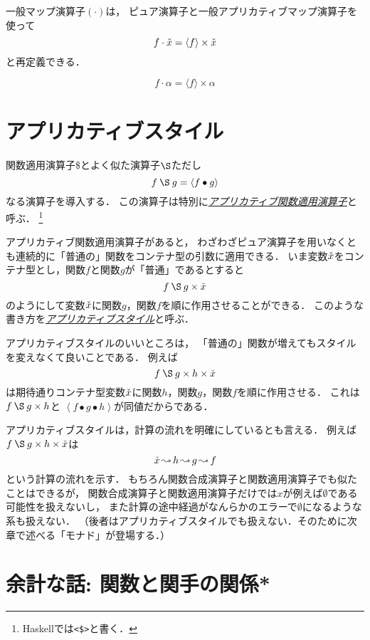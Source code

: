 \documentclass[a4paper,draft]{jsbook}
\newcommand{\programminglanguage}[1]{\textsf{#1}}
\newcommand{\haskell}{\programminglanguage{Haskell}}
\newcommand{\keyword}[1]{{\underline{\emph{#1}}}}
\newcommand{\code}[1]{\texttt{#1}}
\newcommand{\mPureOf}[1]{\langle#1\rangle}
\DeclareMathOperator{\mFlow}{\leadsto}
\DeclareMathOperator{\mMap}{\cdot}
\DeclareMathOperator{\mApplicativeMap}{\times}
\newcommand{\mathContainerVar}[1]{\Check{#1}}
\newcommand{\mathPureWith}[1]{\left\langle#1\right\rangle}
\newcommand{\mathNothing}{\emptyset}
\newcommand{\mathApplicativeApply}{\mathbin{\S}}
\newcommand{\mathApplicativeGeneralMap}{\mathbin{\times}}
\newcommand{\mathApply}{\mathbin{\$}}
\newcommand{\mathCompose}{\mathbin{\bullet}}
\newcommand{\mathGeneralMap}{\mathbin{\cdot}}
\begin{document}
一般マップ演算子$(\mathGeneralMap)$は，
ピュア演算子と一般アプリカティブマップ演算子を使って
$$
f\mathGeneralMap\mathContainerVar{x}=\mathPureWith{f}\mathApplicativeGeneralMap\mathContainerVar{x}
$$
と再定義できる．

$$f\mMap\alpha=\mPureOf{f}\mApplicativeMap\alpha$$

\section{アプリカティブスタイル}

関数適用演算子$\mathApply$とよく似た演算子$\mathApplicativeApply$ただし
$$
f\mathApplicativeApply g=\mathPureWith{f\mathCompose g}
$$
なる演算子を導入する．
この演算子は特別に\keyword{アプリカティブ関数適用演算子}と呼ぶ．%
\footnote{\haskell では\code{<\$>}と書く．}

アプリカティブ関数適用演算子があると，
わざわざピュア演算子を用いなくとも連続的に「普通の」関数をコンテナ型の引数に適用できる．
いま変数$\mathContainerVar{x}$をコンテナ型とし，関数$f$と関数$g$が「普通」であるとすると
$$
f\mathApplicativeApply g\mathApplicativeGeneralMap\mathContainerVar{x}
$$
のようにして変数$\mathContainerVar{x}$に関数$g$，関数$f$を順に作用させることができる．
このような書き方を\keyword{アプリカティブスタイル}と呼ぶ．

アプリカティブスタイルのいいところは，
「普通の」関数が増えてもスタイルを変えなくて良いことである．
例えば
$$
f\mathApplicativeApply g\mathApplicativeGeneralMap h\mathApplicativeGeneralMap\mathContainerVar{x}
$$
は期待通りコンテナ型変数$\mathContainerVar{x}$に関数$h$，関数$g$，関数$f$を順に作用させる．
これは$f\mathApplicativeApply g\mathApplicativeGeneralMap h$と%
$\mathPureWith{f\mathCompose g\mathCompose h}$が同値だからである．

アプリカティブスタイルは，計算の流れを明確にしているとも言える．
例えば$f\mathApplicativeApply g\mathApplicativeGeneralMap h\mathApplicativeGeneralMap\mathContainerVar{x}$は
$$
\mathContainerVar{x}\mFlow h\mFlow g\mFlow f
$$
という計算の流れを示す．
もちろん関数合成演算子と関数適用演算子でも似たことはできるが，
関数合成演算子と関数適用演算子だけでは$x$が例えば$\mathNothing$である可能性を扱えないし，
また計算の途中経過がなんらかのエラーで$\mathNothing$になるような系も扱えない．
（後者はアプリカティブスタイルでも扱えない．そのために次章で述べる「モナド」が登場する．）

\section{余計な話: 関数と関手の関係*}
\end{document}
